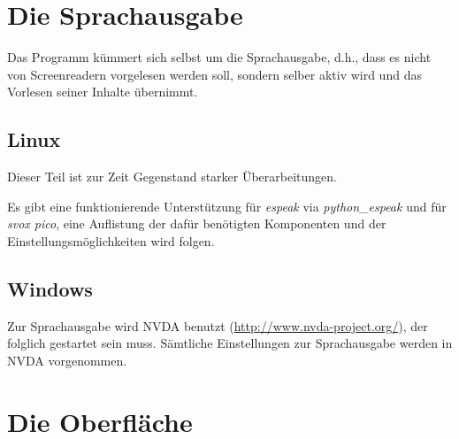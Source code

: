 \documentclass[a4paper]{scrartcl}
\let\origitem\item
\renewcommand{\item}{\normalfont\origitem}
\begin{document}
\section{Die Sprachausgabe}
Das Programm kümmert sich selbst um die Sprachausgabe, d.h., dass es nicht von Screenreadern vorgelesen werden soll, sondern selber aktiv wird und das Vorlesen seiner Inhalte übernimmt.

\subsection{Linux}

Dieser Teil ist zur Zeit Gegenstand starker Überarbeitungen.

Es gibt eine funktionierende Unterstützung für \textit{espeak} via \textit{python\_espeak} und für \textit{svox pico}, eine Auflistung der dafür benötigten Komponenten und der Einstellungsmöglichkeiten wird folgen.
%

\subsection{Windows}
Zur Sprachausgabe wird NVDA benutzt (\url{http://www.nvda-project.org/}), der folglich gestartet sein muss. Sämtliche Einstellungen zur Sprachausgabe werden in NVDA vorgenommen.


\section{Die Oberfläche}
\end{document}
